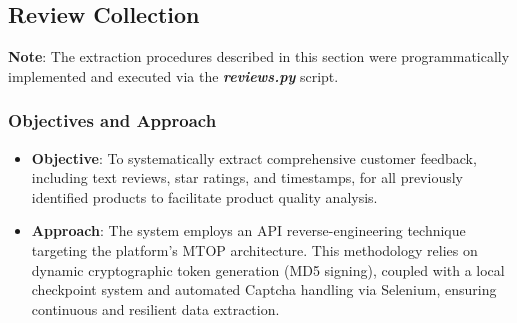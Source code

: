     \subsection{Review Collection}
    \textbf{Note}: The extraction procedures described in this section were programmatically implemented and executed via the \textbf{\textit{reviews.py}} script.
        \subsubsection{Objectives and Approach}
        \begin{itemize}
            \item \textbf{Objective}: To systematically extract comprehensive customer feedback, including text reviews, star ratings, and timestamps, for all previously identified products to facilitate product quality analysis.
            \item \textbf{Approach}: The system employs an API reverse-engineering technique targeting the platform's MTOP architecture. This methodology relies on dynamic cryptographic token generation (MD5 signing), coupled with a local checkpoint system and automated Captcha handling via Selenium, ensuring continuous and resilient data extraction.
        \end{itemize}


